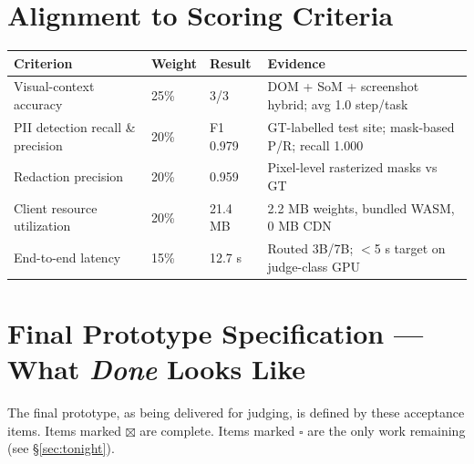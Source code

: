 \documentclass[11pt,a4paper]{article}
\newcommand{\good}{\textcolor{good}{$\boxtimes$}}
\newcommand{\todo}{\textcolor{amber}{$\square$}}
\renewcommand{\arraystretch}{1.25}
\begin{document}
\begin{itemize}
\section{Alignment to Scoring Criteria}

\begin{table}[H]
\small
\renewcommand{\arraystretch}{1.3}
\begin{tabularx}{\linewidth}{@{}p{4.6cm}p{1.6cm}p{0.9cm}X@{}}
\toprule
\textbf{Criterion} & \textbf{Weight} & \textbf{Result} & \textbf{Evidence} \\
\midrule
Visual-context accuracy & 25\% & 3/3 & DOM + SoM + screenshot hybrid; avg 1.0 step/task \\
PII detection recall \& precision & 20\% & F1 0.979 & GT-labelled test site; mask-based P/R; recall 1.000 \\
Redaction precision & 20\% & 0.959 & Pixel-level rasterized masks vs GT \\
Client resource utilization & 20\% & 21.4 MB & 2.2 MB weights, bundled WASM, 0 MB CDN \\
End-to-end latency & 15\% & 12.7 s & Routed 3B/7B; $<$5 s target on judge-class GPU \\
\bottomrule
\end{tabularx}
\end{table}

\section{Final Prototype Specification --- What \emph{Done} Looks Like} \label{sec:spec}

The final prototype, as being delivered for judging, is defined by these acceptance items. Items marked \good{} are complete. Items marked \todo{} are the only work remaining (see \S\ref{sec:tonight}).


\end{itemize}
\end{document}
